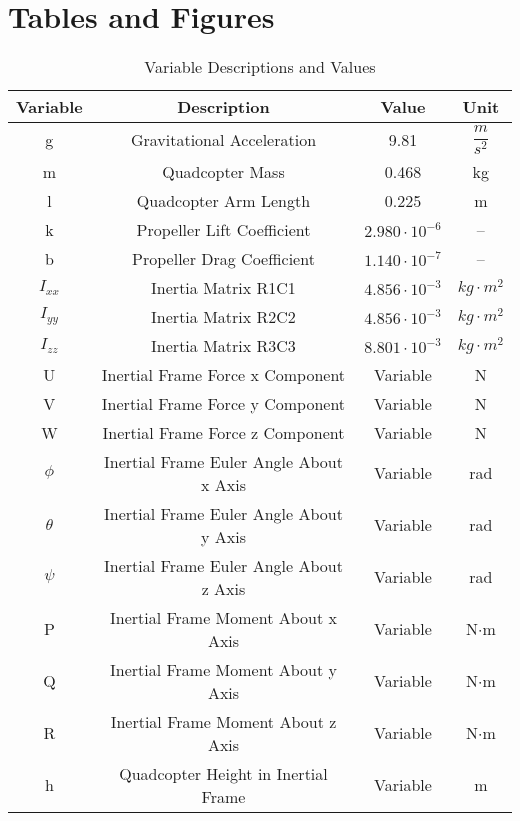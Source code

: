 \newpage
\section*{Tables and Figures}

\begin{table}[h!]
    \centering
    \begin{tabular}{|c|c|c|c|}
    \hline
    \textbf{Variable} & \textbf{Description}                                                 & \textbf{Value} & \textbf{Unit} \\ \hline
    g      & Gravitational Acceleration & 9.81 & $\dfrac{m}{s^2}$ \\ \hline
    m      & Quadcopter Mass & 0.468 & kg            \\ \hline
    l      & Quadcopter Arm Length & 0.225          & m             \\ \hline
    k      & Propeller Lift Coefficient &       $2.980 \cdot 10^{-6}$        & --            \\ \hline
    b      & Propeller Drag Coefficient &       $1.140 \cdot 10^{-7}$         & --            \\ \hline
    $I_{xx}$ & Inertia Matrix R1C1        &         $4.856 \cdot 10^{-3}$       &  $kg \cdot m^2$             \\ \hline
    $I_{yy}$ & Inertia Matrix R2C2        &     $4.856 \cdot 10^{-3}$           &    $kg \cdot m^2$           \\ \hline
    $I_{zz}$ & Inertia Matrix R3C3        &     $8.801 \cdot 10^{-3}$           &    $kg \cdot m^2$           \\ \hline
    U        & Inertial Frame Force x Component & Variable & N  \\ \hline
    V        & Inertial Frame Force y Component & Variable & N  \\ \hline
    W        & Inertial Frame Force z Component & Variable & N  \\ \hline
    $\phi$   & Inertial Frame Euler Angle About x Axis & Variable & rad  \\ \hline
    $\theta$ & Inertial Frame Euler Angle About y Axis & Variable & rad  \\ \hline
    $\psi$   & Inertial Frame Euler Angle About z Axis & Variable & rad  \\ \hline
    P        & Inertial Frame Moment About x Axis & Variable & N$\cdot$m  \\ \hline
    Q        & Inertial Frame Moment About y Axis & Variable & N$\cdot$m  \\ \hline
    R        & Inertial Frame Moment About z Axis & Variable & N$\cdot$m  \\ \hline
    h        & Quadcopter Height in Inertial Frame & Variable & m  \\ \hline
    \end{tabular}
    \caption{Variable Descriptions and Values}
\end{table}

